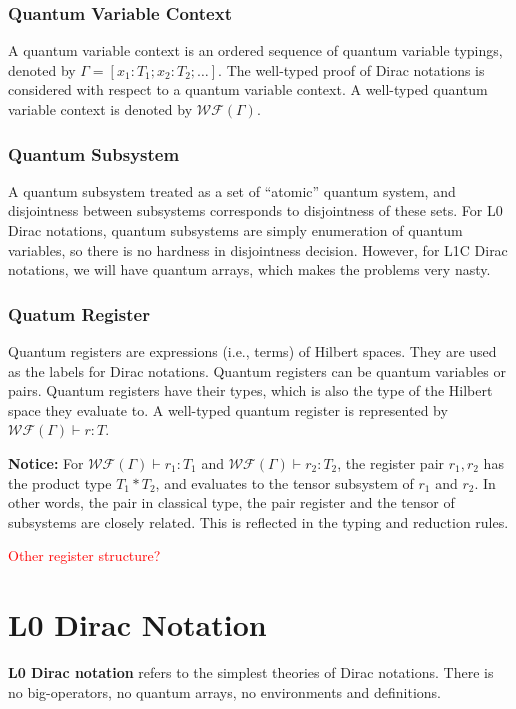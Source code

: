 \documentclass{article}
\begin{document}
\subsubsection*{Quantum Variable Context}
A quantum variable context is an ordered sequence of quantum variable typings, denoted by $\Gamma = [x_1 : T_1; x_2 : T_2; \dots]$. The well-typed proof of Dirac notations is considered with respect to a quantum variable context. A well-typed quantum variable context is denoted by $\mathcal{WF}(\Gamma)$.

\subsubsection*{Quantum Subsystem}
A quantum subsystem treated as a set of ``atomic'' quantum system, and disjointness between subsystems corresponds to disjointness of these sets. For L0 Dirac notations, quantum subsystems are simply enumeration of quantum variables, so there is no hardness in disjointness decision. However, for L1C Dirac notations, we will have quantum arrays, which makes the problems very nasty.

\subsubsection*{Quatum Register}
Quantum registers are expressions (i.e., terms) of Hilbert spaces. They are used as the labels for Dirac notations. Quantum registers can be quantum variables or pairs. Quantum registers have their types, which is also the type of the Hilbert space they evaluate to. A well-typed quantum register is represented by $\mathcal{WF}(\Gamma) \vdash r : T$.

\textbf{Notice:} For $\mathcal{WF}(\Gamma) \vdash r_1 : T_1$ and $\mathcal{WF}(\Gamma) \vdash r_2 : T_2$, the register pair $r_1, r_2$ has the product type $T_1 * T_2$, and evaluates to the tensor subsystem of $r_1$ and $r_2$. In other words, the pair in classical type, the pair register and the tensor of subsystems are closely related. This is reflected in the typing and reduction rules.

\textcolor{red}{Other register structure?}


\section{L0 Dirac Notation}

\textbf{L0 Dirac notation} refers to the simplest theories of Dirac notations. There is no big-operators, no quantum arrays, no environments and definitions.
\end{document}

